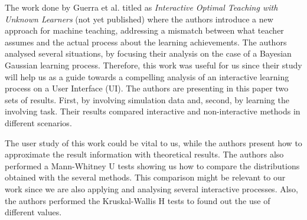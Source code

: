 
The work done by Guerra et al. titled as \textit{Interactive Optimal Teaching with Unknown Learners} (not yet published) where the authors introduce a new approach for machine teaching, addressing a mismatch between what teacher assumes and the actual process about the learning achievements. The authors analysed several situations, by focusing their analysis on the case of a Bayesian Gaussian learning \cite{zhu2013machine} process. Therefore, this work was useful for us since their study will help us as a guide towards a compelling analysis of an interactive learning process on a User Interface (UI). The authors are presenting in this paper two sets of results. First, by involving simulation data and, second, by learning the involving task. Their results compared interactive and non-interactive methods in different scenarios.

The user study of this work could be vital to us, while the authors present how to approximate the result information with theoretical results. The authors also performed a Mann-Whitney U tests \cite{macfarland2016mann} showing us how to compare the distributions obtained with the several methods. This comparison might be relevant to our work since we are also applying and analysing several interactive processes. Also, the authors performed the Kruskal-Wallis H tests \cite{cleophas2016non} to found out the use of different values.